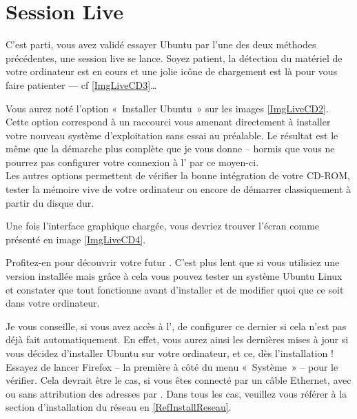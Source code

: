 \section{Session Live}
\label{RefSessionLive}
C'est parti, vous avez validé essayer Ubuntu par l'une des deux méthodes précédentes, une session live se lance. Soyez patient, la détection du matériel de votre ordinateur est en cours et une jolie icône de chargement est là pour vous faire patienter --- cf \ref{ImgLiveCD3}\ldots{}\par
\begin{nota}
Vous aurez noté l'option «~Installer Ubuntu~» sur les images \ref{ImgLiveCD2}. Cette option correspond à un raccourci vous amenant directement à installer votre nouveau système d'exploitation sans essai au préalable. Le résultat est le même que la démarche plus complète que je vous donne -- hormis que vous ne pourrez pas configurer votre connexion à l' par ce moyen-ci.\\
Les autres options permettent de vérifier la bonne intégration de votre CD-ROM, tester la mémoire vive de votre ordinateur ou encore de démarrer classiquement à partir du disque dur.
\end{nota}
Une fois l'interface graphique chargée, vous devriez trouver l'écran comme présenté en image \ref{ImgLiveCD4}.\par
{}
Profitez-en pour découvrir votre futur . C'est plus lent que si vous utilisiez une version installée mais grâce à cela vous pouvez tester un système Ubuntu Linux et constater que tout fonctionne avant d'installer et de modifier quoi que ce soit dans votre ordinateur.
\begin{nota}
Je vous conseille, si vous avez accès à l', de configurer ce dernier si cela n'est pas déjà fait automatiquement. En effet, vous aurez ainsi les dernières mises à jour si vous décidez d'installer Ubuntu sur votre ordinateur, et ce, dès l'installation ! Essayez de lancer Firefox -- la première  à côté du menu «~Système~» -- pour le vérifier. Cela devrait être le cas, si vous êtes connecté par un câble Ethernet,  avec ou sans attribution des adresses par . Dans tous les cas, veuillez vous référer à la section d'installation du réseau en \ref{RefInstallReseau}.
\end{nota}

